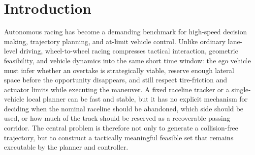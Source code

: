 \documentclass{iopjournal}
\newcommand{\IEEEPARstart}[2]{#1#2}
\begin{document}
\section{Introduction}
\IEEEPARstart{A}{utonomous} racing has become a demanding benchmark for
high-speed decision making, trajectory planning, and at-limit vehicle control.
Unlike ordinary lane-level driving, wheel-to-wheel racing compresses tactical
interaction, geometric feasibility, and vehicle dynamics into the same short
time window: the ego vehicle must infer whether an overtake is strategically
viable, reserve enough lateral space before the opportunity disappears, and
still respect tire-friction and actuator limits while executing the maneuver.
A fixed raceline tracker or a single-vehicle local planner can be fast and
stable, but it has no explicit mechanism for deciding when the nominal
raceline should be abandoned, which side should be used, or how much of the
track should be reserved as a recoverable passing corridor.  The central
problem is therefore not only to generate a collision-free trajectory, but to
construct a tactically meaningful feasible set that remains executable by the
planner and controller.
\end{document}
